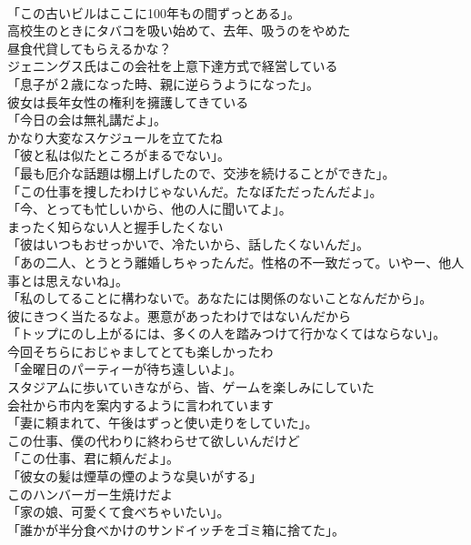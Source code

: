 \documentclass[8pt]{extreport}
\begin{document}
\begin{CJK}{UTF8}{min}
\\	「この古いビルはここに100年もの間ずっとある」。	
\\	高校生のときにタバコを吸い始めて、去年、吸うのをやめた	
\\	昼食代貸してもらえるかな？	
\\	ジェニングス氏はこの会社を上意下達方式で経営している	
\\	「息子が２歳になった時、親に逆らうようになった」。	
\\	彼女は長年女性の権利を擁護してきている	
\\	「今日の会は無礼講だよ」。	
\\	かなり大変なスケジュールを立てたね	
\\	「彼と私は似たところがまるでない」。	
\\	「最も厄介な話題は棚上げしたので、交渉を続けることができた」。	
\\	「この仕事を捜したわけじゃないんだ。たなぼただったんだよ」。	
\\	「今、とっても忙しいから、他の人に聞いてよ」。	
\\	まったく知らない人と握手したくない	
\\	「彼はいつもおせっかいで、冷たいから、話したくないんだ」。	
\\	「あの二人、とうとう離婚しちゃったんだ。性格の不一致だって。いやー、他人事とは思えないね」。	
\\	「私のしてることに構わないで。あなたには関係のないことなんだから」。	
\\	彼にきつく当たるなよ。悪意があったわけではないんだから	
\\	「トップにのし上がるには、多くの人を踏みつけて行かなくてはならない」。	
\\	今回そちらにおじゃましてとても楽しかったわ	
\\	「金曜日のパーティーが待ち遠しいよ」。	
\\	スタジアムに歩いていきながら、皆、ゲームを楽しみにしていた	
\\	会社から市内を案内するように言われています	
\\	「妻に頼まれて、午後はずっと使い走りをしていた」。	
\\	この仕事、僕の代わりに終わらせて欲しいんだけど	
\\	「この仕事、君に頼んだよ」。	
\\	「彼女の髪は煙草の煙のような臭いがする」	
\\	このハンバーガー生焼けだよ	
\\	「家の娘、可愛くて食べちゃいたい」。	
\\	「誰かが半分食べかけのサンドイッチをゴミ箱に捨てた」。	

\end{CJK}
\end{document}
